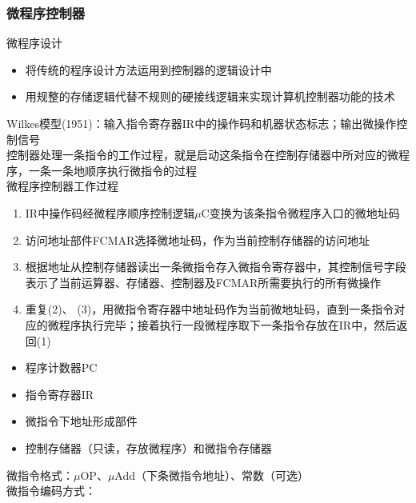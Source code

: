 \subsubsection{微程序控制器}
\begin{center}
\end{center}
微程序设计
\begin{itemize}
	\item 将传统的程序设计方法运用到控制器的逻辑设计中
	\item 用规整的存储逻辑代替不规则的硬接线逻辑来实现计算机控制器功能的技术
\end{itemize}
Wilkes模型(1951)：输入指令寄存器IR中的操作码和机器状态标志；输出微操作控制信号\\
控制器处理一条指令的工作过程，就是启动这条指令在控制存储器中所对应的微程序，一条一条地顺序执行微指令的过程\\
微程序控制器工作过程
\begin{enumerate}
	\item IR中操作码经微程序顺序控制逻辑$\mu$C变换为该条指令微程序入口的微地址码
	\item 访问地址部件FCMAR选择微地址码，作为当前控制存储器的访问地址
	\item 根据地址从控制存储器读出一条微指令存入微指令寄存器中，其控制信号字段表示了当前运算器、存储器、控制器及FCMAR所需要执行的所有微操作
	\item 重复(2)、 (3)，用微指令寄存器中地址码作为当前微地址码，直到一条指令对应的微程序执行完毕；接着执行一段微程序取下一条指令存放在IR中，然后返回(1)
\end{enumerate}
\begin{itemize}
	\item 程序计数器PC
	\item 指令寄存器IR
	\item 微指令下地址形成部件
	\item 控制存储器（只读，存放微程序）和微指令存储器
\end{itemize}
微指令格式：$\mu$OP、$\mu$Add（下条微指令地址）、常数（可选）\\
微指令编码方式：
